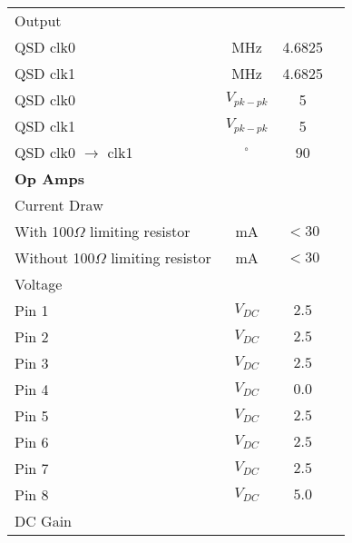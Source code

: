 \documentclass{article}[12pt]
\newcommand{\measline}{\underline{\hspace{0.75in}}}
\begin{document}
\begin{longtable}{lccc}
\multicolumn{4}{l}{\hspace{0.25in}Output} \\
\hspace{0.5in}QSD clk0 & MHz & 4.6825 & \measline \\
\hspace{0.5in}QSD clk1 & MHz & 4.6825 & \measline \\
\hspace{0.5in}QSD clk0 & $V_{pk-pk}$ & 5 & \measline \\
\hspace{0.5in}QSD clk1 & $V_{pk-pk}$ & 5 & \measline \\
\hspace{0.5in}QSD clk0 $\rightarrow$ clk1 & $^\circ$ & 90 & \measline \\
\hline
\multicolumn{4}{l}{\bf Op Amps} \\
\multicolumn{4}{l}{\hspace{0.25in}Current Draw} \\
\hspace{0.5in}With 100$\Omega$ limiting resistor & mA & $< 30$ & \measline \\
\hspace{0.5in}Without 100$\Omega$ limiting resistor & mA & $< 30$ & \measline \\
\multicolumn{4}{l}{\hspace{0.25in}Voltage} \\
\hspace{0.5in}Pin 1 & $V_{DC}$ & $2.5$ & \measline \\
\hspace{0.5in}Pin 2 & $V_{DC}$ & $2.5$ & \measline \\
\hspace{0.5in}Pin 3 & $V_{DC}$ & $2.5$ & \measline \\
\hspace{0.5in}Pin 4 & $V_{DC}$ & $0.0$ & \measline \\
\hspace{0.5in}Pin 5 & $V_{DC}$ & $2.5$ & \measline \\
\hspace{0.5in}Pin 6 & $V_{DC}$ & $2.5$ & \measline \\
\hspace{0.5in}Pin 7 & $V_{DC}$ & $2.5$ & \measline \\
\hspace{0.5in}Pin 8 & $V_{DC}$ & $5.0$ & \measline \\
\multicolumn{4}{l}{\hspace{0.25in}DC Gain} \\

\end{longtable}
\end{document}
